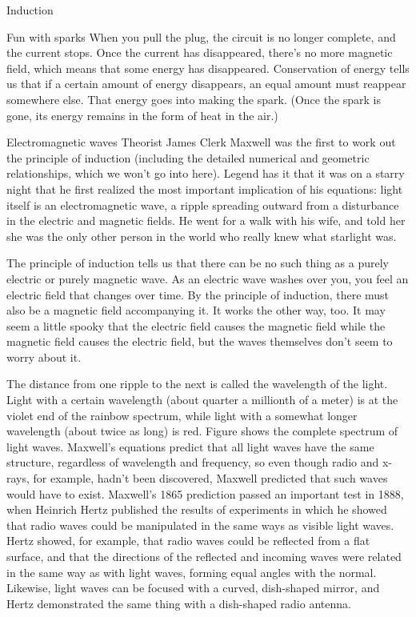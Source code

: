 \begin{envsubsection}{Induction}
\begin{eg}{Fun with sparks}
When you pull the plug, the circuit is no longer complete, and the current stops. Once the current
has disappeared, there's no more magnetic field, which means that some energy has disappeared.
Conservation of energy tells us that if a certain amount of energy disappears, an equal amount
must reappear somewhere else. That energy goes into making the spark. (Once the spark is gone,
its energy remains in the form of heat in the air.)
\end{eg}

\end{envsubsection}	
%
\begin{envsubsection}{Electromagnetic waves}
	Theorist James Clerk Maxwell was the first to work out the principle of induction (including
	the detailed numerical and geometric relationships, which we won't go into here).
	Legend has it that
	 it was on a starry night that he first realized the most important implication of his equations:
	light itself is an electromagnetic wave, a ripple spreading outward from a disturbance
	in the electric and magnetic fields.
	 He went for a walk with his wife, and told her she was the only other person in
	 the world who really knew what starlight
	was.

	The principle of induction tells us that there can be no such thing as a purely electric or
	purely magnetic wave. As an electric wave washes over you, you feel an electric field that
	changes over time. By the principle of induction, there must also be a magnetic field
	accompanying it. It works the other way, too. It may seem a little spooky that the electric
	field causes the magnetic field while the magnetic field causes the electric field, but the
	waves themselves don't seem to worry about it.

	 The distance from one ripple to the next
	is called the wavelength of the light. Light with a certain wavelength
	(about quarter a millionth of a meter) is at the violet end of the rainbow spectrum, while
	light with a somewhat longer wavelength (about twice as long) is red.
	Figure  shows the complete spectrum of light waves.
	Maxwell's equations predict that all light waves have the same structure,
	regardless of wavelength and frequency, so even though radio and x-rays, for example,
	hadn't been discovered, Maxwell predicted that such waves would have to exist.
	Maxwell's 1865 prediction passed an important test in 1888, when
	Heinrich Hertz published the results of experiments in which he showed
	that radio waves could be manipulated in the same ways as visible light waves. Hertz
	showed, for example, that radio waves could be reflected from a flat surface, and
	that the directions of the reflected and incoming waves were related in the same
	way as with light waves, forming equal angles with the normal. Likewise,
	light waves can be focused with a curved, dish-shaped mirror, and Hertz demonstrated
	the same thing with a dish-shaped radio antenna.


\end{envsubsection}
